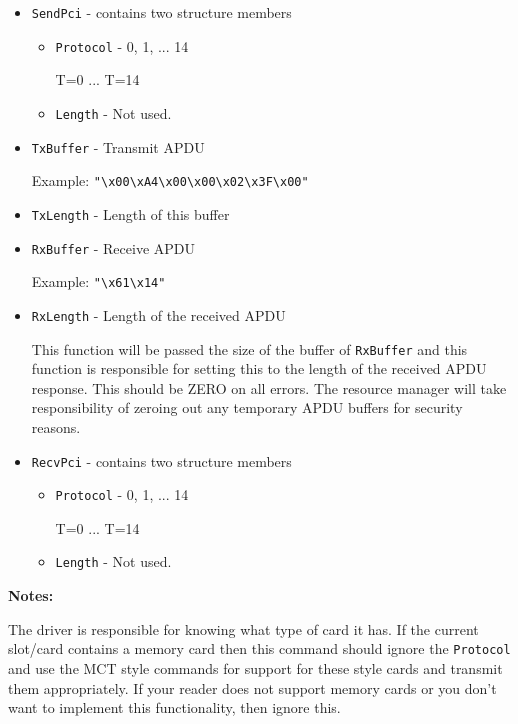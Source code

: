 \documentclass[a4paper,12pt]{article}
\newcommand{\tab}{}
\begin{document}
\begin{itemize}
\item \texttt{SendPci} - contains two structure members

\begin{itemize}
\item \texttt{Protocol} - 0, 1, ... 14

T=0 ... T=14

\item \texttt{Length} \tab - Not used.
\end{itemize}

\item \texttt{TxBuffer} \tab - Transmit APDU

Example: \verb+"\x00\xA4\x00\x00\x02\x3F\x00"+

\item \texttt{TxLength} \tab - Length of this buffer
\item \texttt{RxBuffer} \tab - Receive APDU

Example: \verb+"\x61\x14"+

\item \texttt{RxLength} \tab - Length of the received APDU

This function will be passed the size of the buffer of \texttt{RxBuffer}
and this function is responsible for setting this to the length of the
received APDU response. This should be ZERO on all errors. The resource
manager will take responsibility of zeroing out any temporary APDU
buffers for security reasons.

\item \texttt{RecvPci} - contains two structure members

\begin{itemize}
\item \texttt{Protocol} - 0, 1, ... 14

T=0 ... T=14

\item \texttt{Length} - Not used.
\end{itemize}
\end{itemize}

\textbf{Notes:}

The driver is responsible for knowing what type of card it has.  If the
current slot/card contains a memory card then this command should ignore
the \texttt{Protocol} and use the MCT style commands for support for
these style cards and transmit them appropriately. If your reader does
not support memory cards or you don't want to implement this
functionality, then ignore this.
\end{document}

